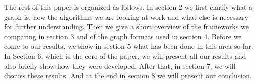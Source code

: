 The rest of this paper is organized as follows.
In section 2 we first clarify what a graph is, how the algorithms we are looking at work and what else is necessary for further understanding. Then we give a short overview of the frameworks we comparing in section 3 and of the graph formats used in section 4. 
Before we come to our results, we show in section 5 what has been done in this area so far. 
In Section 6, which is the core of the paper, we will present all our results and also briefly show how they were developed. 
After that, in section 7, we will discuss these results. And at the end in section 8 we will present our conclusion.
